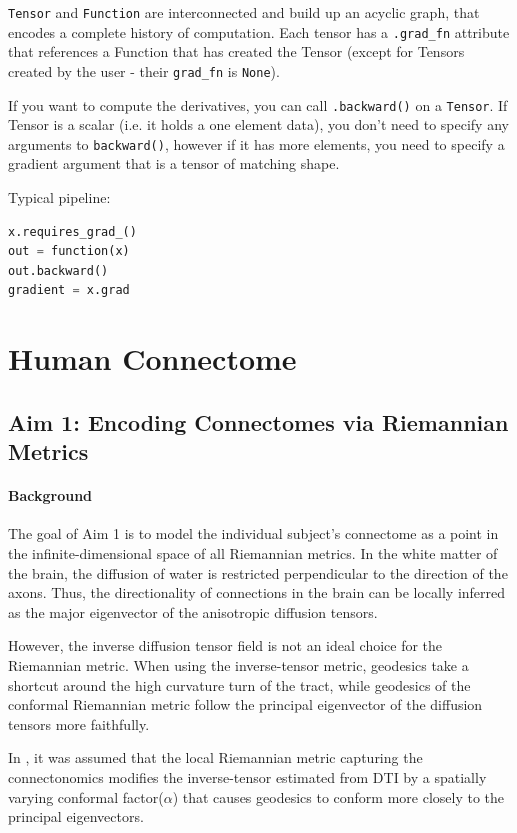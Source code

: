\documentclass{article}
\theoremstyle{definition}
\theoremstyle{plain}
\begin{document}
\texttt{Tensor} and \texttt{Function} are interconnected and build up an acyclic graph, that encodes a complete history of computation. Each tensor has a \texttt{.grad\_fn} attribute that references a Function that has created the Tensor (except for Tensors created by the user - their \texttt{grad\_fn} is \texttt{None}).

If you want to compute the derivatives, you can call \texttt{.backward()} on a \texttt{Tensor}. If Tensor is a scalar (i.e. it holds a one element data), you don’t need to specify any arguments to \texttt{backward()}, however if it has more elements, you need to specify a gradient argument that is a tensor of matching shape.

Typical pipeline:
\begin{lstlisting}[language=Python]
x.requires_grad_()
out = function(x)
out.backward()
gradient = x.grad
\end{lstlisting}

\newpage
\section{Human Connectome}
\subsection{Aim 1: Encoding Connectomes via Riemannian Metrics}
\paragraph{Background}The goal of Aim 1 is to model the individual subject's connectome as a point in the infinite-dimensional space of all Riemannian metrics. In the white matter of the brain, the diffusion of water is restricted perpendicular to the direction of the axons. Thus, the directionality of connections in the brain can be locally inferred as the major eigenvector of the anisotropic diffusion tensors.

However, the inverse diffusion tensor field is not an ideal choice for the Riemannian metric. When using the inverse-tensor metric, geodesics take a shortcut around the high curvature turn of the tract, while geodesics of the conformal Riemannian metric follow the principal eigenvector of the diffusion tensors more faithfully. 

In \cite{hao}, it was assumed that the local Riemannian metric capturing the connectonomics modifies the inverse-tensor estimated from DTI by a spatially varying conformal factor($\alpha$) that causes geodesics to conform more closely to the principal eigenvectors.
\end{document}
